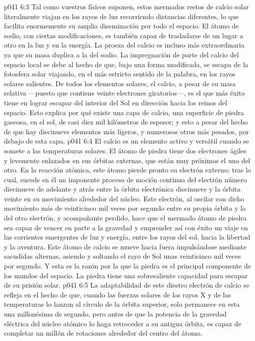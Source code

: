 \vs p041 6:3 \pc Tal como vuestros físicos suponen, estos mermados restos de calcio solar literalmente viajan en los rayos de luz recorriendo distancias diferentes, lo que facilita enormemente su amplia diseminación por todo el espacio. El átomo de sodio, con ciertas modificaciones, es también capaz de trasladarse de un lugar a otro en la luz y en la energía. La proeza del calcio es incluso más extraordinaria ya que su masa duplica a la del sodio. La impregnación de parte del calcio del espacio local se debe al hecho de que, bajo una forma modificada, se escapa de la fotosfera solar viajando, en el más estricto sentido de la palabra, en los rayos solares salientes. De todos los elementos solares, el calcio, a pesar de su masa relativa ---puesto que contiene veinte electrones giratorios---, es el que más éxito tiene en lograr escapar del interior del Sol en dirección hacia los reinos del espacio. Esto explica por qué existe una capa de calcio, una superficie de piedra gaseosa, en el sol, de casi diez mil kilómetros de espesor; y esto a pesar del hecho de que hay diecinueve elementos más ligeros, y numerosos otros más pesados, por debajo de esta capa.
\vs p041 6:4 El calcio es un elemento activo y versátil cuando se somete a las temperaturas solares. El átomo de piedra tiene dos electrones ágiles y levemente enlazados en sus órbitas externas, que están muy próximos el uno del otro. En la reacción atómica, este átomo pierde pronto su electrón externo; tras lo cual, sucede en él un imponente proceso de moción continua del electrón número diecinueve de adelante y atrás entre la órbita electrónica diecinueve y la órbita veinte en su movimiento alrededor del núcleo. Este electrón, al oscilar con dicho movimiento más de veinticinco mil veces por segundo entre su propia órbita y la del otro electrón, y acompañante perdido, hace que el mermado átomo de piedra sea capaz de vencer en parte a la gravedad y emprender así con éxito un viaje en las corrientes emergentes de luz y energía, entre los rayos del sol, hacia la libertad y la aventura. Este átomo de calcio se mueve hacia fuera impulsándose mediante sacudidas alternas, asiendo y soltando el rayo de Sol unas veinticinco mil veces por segundo. Y esta es la razón por la que la piedra es el principal componente de los mundos del espacio. La piedra tiene una sobresaliente capacidad para escapar de su prisión solar.
\vs p041 6:5 La adaptabilidad de este diestro electrón de calcio se refleja en el hecho de que, cuando las fuerzas solares de los rayos X y de las temperaturas lo lanzan al círculo de la órbita superior, solo permanece en esta una millonésima de segundo, pero antes de que la potencia de la gravedad eléctrica del núcleo atómico lo haga retroceder a su antigua órbita, es capaz de completar un millón de rotaciones alrededor del centro del átomo.

